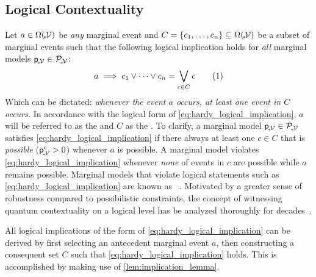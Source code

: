 \documentclass[aps, 10pt, english, twoside, twocolumn, pra, nofootinbib, tightenlines, longbibliography, superscriptaddress]{revtex4-1}
\begin{document}
    \subsection{Logical Contextuality}
    \label{sec:logical_contextuality}
    Let $a \in \events{\mscenariowrap}$ be \textit{any} marginal event and $C = \bc{c_1, \ldots, c_n} \subseteq \events{\mscenariowrap}$ be a subset of marginal events such that the following logical implication holds for \textit{all} marginal models ${\mathsf{p}}_{\!{}_*\!\mathcal{V}} \in \mathcal{P}_{\!{}_*\!\mathcal{V}}$:
    \[ a \implies c_1 \vee \cdots \vee c_n = \bigvee_{c \in C} c \eq \label{eq:hardy_logical_implication} \]
    Which can be dictated: \textit{whenever the event $a$ occurs, at least one event in $C$ occurs.} In accordance with the logical form of \cref{eq:hardy_logical_implication}, $a$ will be referred to as the  and $C$ as the . To clarify, a marginal model ${\mathsf{p}}_{\!{}_*\!\mathcal{V}} \in \mathcal{P}_{\!{}_*\!\mathcal{V}}$ satisfies \cref{eq:hardy_logical_implication} if there always at least one $c \in C$ that is \textit{possible} (${\mathsf{p}}_{\!{}_*\!\mathcal{V}}^{c} > 0$) whenever $a$ is possible. A marginal model violates \cref{eq:hardy_logical_implication} whenever \textit{none} of events in $c$ are possible while $a$ remains possible. Marginal models that violate logical statements such as \cref{eq:hardy_logical_implication} are known as ~\cite{Inflation,Mansfield_2012,Mancinska_2014}. Motivated by a greater sense of robustness compared to possibilistic constraints, the concept of witnessing quantum contextuality on a logical level has be analyzed thoroughly for decades~\cite{Abramsky_2012,Greenberger_1990}.

    All logical implications of the form of \cref{eq:hardy_logical_implication} can be derived by first selecting an antecedent marginal event $a$, then constructing a consequent set $C$ such that \cref{eq:hardy_logical_implication} holds. This is accomplished by making use of \cref{lem:implication_lemma}.
\end{document}
